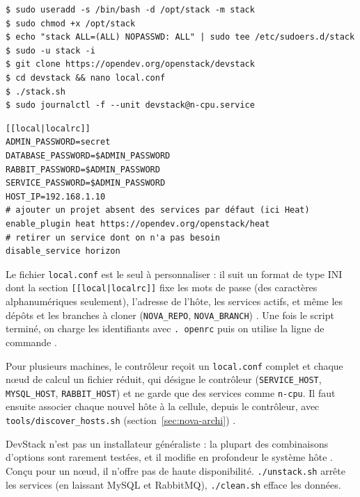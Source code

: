 \par\noindent\begin{minipage}{\linewidth}
\begin{lstlisting}[style=terminal]
$ sudo useradd -s /bin/bash -d /opt/stack -m stack
$ sudo chmod +x /opt/stack
$ echo "stack ALL=(ALL) NOPASSWD: ALL" | sudo tee /etc/sudoers.d/stack
$ sudo -u stack -i
$ git clone https://opendev.org/openstack/devstack
$ cd devstack && nano local.conf
$ ./stack.sh
$ sudo journalctl -f --unit devstack@n-cpu.service
\end{lstlisting}
\end{minipage}\par

\par\noindent\begin{minipage}{\linewidth}
\begin{lstlisting}
[[local|localrc]]
ADMIN_PASSWORD=secret
DATABASE_PASSWORD=$ADMIN_PASSWORD
RABBIT_PASSWORD=$ADMIN_PASSWORD
SERVICE_PASSWORD=$ADMIN_PASSWORD
HOST_IP=192.168.1.10
# ajouter un projet absent des services par défaut (ici Heat)
enable_plugin heat https://opendev.org/openstack/heat
# retirer un service dont on n'a pas besoin
disable_service horizon
\end{lstlisting}
\end{minipage}\par

Le fichier \texttt{local.conf} est le seul à personnaliser : il suit un format de type INI dont la section \texttt{[[local|localrc]]}
fixe les mots de passe (des caractères alphanumériques seulement), l'adresse de l'hôte, les services actifs, et même les dépôts et
les branches à cloner (\texttt{NOVA\_REPO}, \texttt{NOVA\_BRANCH}) \parencite{devstack-config}. Une fois le script terminé, on charge les
identifiants avec \texttt{. openrc} puis on utilise la ligne de commande \parencite{devstack-source}.

Pour plusieurs machines, le contrôleur reçoit un \texttt{local.conf} complet et chaque nœud de calcul un fichier réduit, qui
désigne le contrôleur (\texttt{SERVICE\_HOST}, \texttt{MYSQL\_HOST}, \texttt{RABBIT\_HOST}) et ne garde que des services
comme \texttt{n-cpu}. Il faut ensuite associer chaque nouvel hôte à la cellule, depuis le contrôleur, avec
\texttt{tools/discover\_hosts.sh} (section~\ref{sec:nova-archi}) \parencite{devstack-multinode}.

DevStack n'est pas un installateur généraliste : la plupart des combinaisons d'options sont rarement testées, et il modifie en
profondeur le système hôte \parencite{devstack-overview,devstack-source}. Conçu pour un nœud, il n'offre pas de haute disponibilité.
\texttt{./unstack.sh} arrête les services (en laissant MySQL et RabbitMQ), \texttt{./clean.sh} efface les données.

